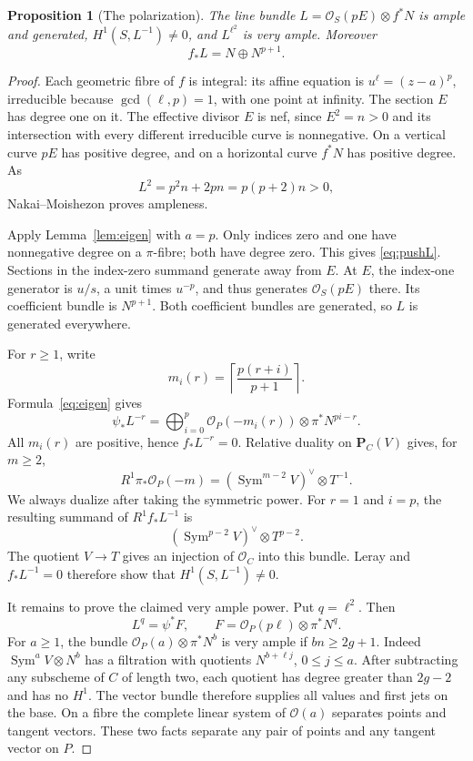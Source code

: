 \documentclass[11pt,a4paper]{article}
\newcommand{\OO}{\mathcal O}
\newcommand{\PP}{\mathbf P}
\newcommand{\Sym}{\operatorname{Sym}}
\newtheorem{proposition}[theorem]{Proposition}
\theoremstyle{definition}\newtheorem{definition}[theorem]{Definition}
\theoremstyle{remark}\newtheorem{remark}[theorem]{Remark}
\numberwithin{equation}{section}
\begin{document}
\begin{proposition}[The polarization]\label{prop:polarization}
The line bundle $L=\OO_S(pE)\otimes f^*N$ is ample and generated, $H^1(S,L^{-1})\ne0$, and $L^{\ell^2}$ is very ample. Moreover
\begin{equation}\label{eq:pushL}
 f_*L=N\oplus N^{p+1}.
\end{equation}
\end{proposition}
\begin{proof}
Each geometric fibre of $f$ is integral: its affine equation is $u^\ell=(z-a)^p$, irreducible because $\gcd(\ell,p)=1$, with one point at infinity. The section $E$ has degree one on it. The effective divisor $E$ is nef, since $E^2=n>0$ and its intersection with every different irreducible curve is nonnegative. On a vertical curve $pE$ has positive degree, and on a horizontal curve $f^*N$ has positive degree. As
\[
 L^2=p^2n+2pn=p(p+2)n>0,
\]
Nakai--Moishezon proves ampleness.

Apply Lemma~\ref{lem:eigen} with $a=p$. Only indices zero and one have nonnegative degree on a $\pi$-fibre; both have degree zero. This gives \eqref{eq:pushL}. Sections in the index-zero summand generate away from $E$. At $E$, the index-one generator is $u/s$, a unit times $u^{-p}$, and thus generates $\OO_S(pE)$ there. Its coefficient bundle is $N^{p+1}$. Both coefficient bundles are generated, so $L$ is generated everywhere.

For $r\ge1$, write
\[
 m_i(r)=\left\lceil\frac{p(r+i)}{p+1}\right\rceil.
\]
Formula~\eqref{eq:eigen} gives
\begin{equation}\label{eq:negative}
 \psi_*L^{-r}=\bigoplus_{i=0}^{p}\OO_P(-m_i(r))\otimes\pi^*N^{pi-r}.
\end{equation}
All $m_i(r)$ are positive, hence $f_*L^{-r}=0$. Relative duality on $\PP_C(V)$ gives, for $m\ge2$,
\begin{equation}\label{eq:duality}
 R^1\pi_*\OO_P(-m)=(\Sym^{m-2}V)^\vee\otimes T^{-1}.
\end{equation}
We always dualize after taking the symmetric power. For $r=1$ and $i=p$, the resulting summand of $R^1f_*L^{-1}$ is
\[
 (\Sym^{p-2}V)^\vee\otimes T^{p-2}.
\]
The quotient $V\to T$ gives an injection of $\OO_C$ into this bundle. Leray and $f_*L^{-1}=0$ therefore show that $H^1(S,L^{-1})\ne0$.

It remains to prove the claimed very ample power. Put $q=\ell^2$. Then
\[
 L^q=\psi^*F,\qquad F=\OO_P(p\ell)\otimes\pi^*N^q.
\]
For $a\ge1$, the bundle $\OO_P(a)\otimes\pi^*N^b$ is very ample if $bn\ge2g+1$. Indeed $\Sym^aV\otimes N^b$ has a filtration with quotients $N^{b+\ell j}$, $0\le j\le a$. After subtracting any subscheme of $C$ of length two, each quotient has degree greater than $2g-2$ and has no $H^1$. The vector bundle therefore supplies all values and first jets on the base. On a fibre the complete linear system of $\OO(a)$ separates points and tangent vectors. These two facts separate any pair of points and any tangent vector on $P$.


\end{proof}
\end{document}
